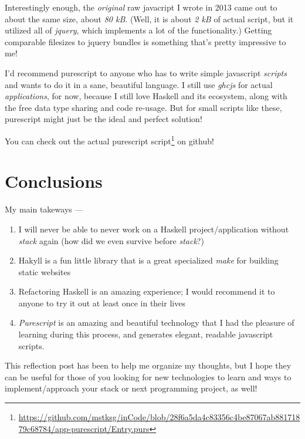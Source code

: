 \documentclass[]{article}
\renewcommand{\href}[2]{#2\footnote{\url{#1}}}
\begin{document}
Interestingly enough, the \emph{original} raw javacript I wrote in 2013 came out
to about the same size, about \emph{80 kB}. (Well, it is about \emph{2 kB} of
actual script, but it utilized all of \emph{jquery}, which implements a lot of
the functionality.) Getting comparable filesizes to jquery bundles is something
that's pretty impressive to me!

I'd recommend purescript to anyone who has to write simple javascript
\emph{scripts} and wants to do it in a sane, beautiful language. I still use
\emph{ghcjs} for actual \emph{applications}, for now, because I still love
Haskell and its ecosystem, along with the free data type sharing and code
re-usage. But for small scripts like these, purescript might just be the ideal
and perfect solution!

You can check out
\href{https://github.com/mstksg/inCode/blob/28f6a5da4c83356c4be87067ab88171879c68784/app-purescript/Entry.purs}{the
actual purescript script} on github!

\section{Conclusions}\label{conclusions}

My main takeways ---

\begin{enumerate}
\def\labelenumi{\arabic{enumi}.}
\tightlist
\item
  I will never be able to never work on a Haskell project/application without
  \emph{stack} again (how did we even survive before \emph{stack}?)
\item
  Hakyll is a fun little library that is a great specialized \emph{make} for
  building static websites
\item
  Refactoring Haskell is an amazing experience; I would recommend it to anyone
  to try it out at least once in their lives
\item
  \emph{Purescript} is an amazing and beautiful technology that I had the
  pleasure of learning during this process, and generates elegant, readable
  javascript scripts.
\end{enumerate}

This reflection post has been to help me organize my thoughts, but I hope they
can be useful for those of you looking for new technologies to learn and ways to
implement/approach your stack or next programming project, as well!
\end{document}

